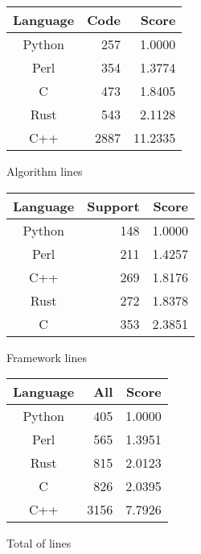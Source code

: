 \begin{subtable}{0.33\textwidth}
    \centering
    \begin{tabular}{|c|r|r|}
        \hline
        Language & Code & Score \\
        \hline
        Python & 257 & 1.0000 \\
        Perl & 354 & 1.3774 \\
        C & 473 & 1.8405 \\
        Rust & 543 & 2.1128 \\
        C++ & 2887 & 11.2335 \\
        \hline
    \end{tabular}
    \caption{Algorithm lines}
    \label{table:sloc:algorithm}
\end{subtable}%
\begin{subtable}{0.33\textwidth}
    \centering
    \begin{tabular}{|c|r|r|}
        \hline
        Language & Support & Score \\
        \hline
        Python & 148 & 1.0000 \\
        Perl & 211 & 1.4257 \\
        C++ & 269 & 1.8176 \\
        Rust & 272 & 1.8378 \\
        C & 353 & 2.3851 \\
        \hline
    \end{tabular}
    \caption{Framework lines}
    \label{table:sloc:framework}
\end{subtable}%
\begin{subtable}{0.33\textwidth}
    \centering
    \begin{tabular}{|c|r|r|}
        \hline
        Language & All & Score \\
        \hline
        Python & 405 & 1.0000 \\
        Perl & 565 & 1.3951 \\
        Rust & 815 & 2.0123 \\
        C & 826 & 2.0395 \\
        C++ & 3156 & 7.7926 \\
        \hline
    \end{tabular}
    \caption{Total of lines}
    \label{table:sloc:all}
\end{subtable}
